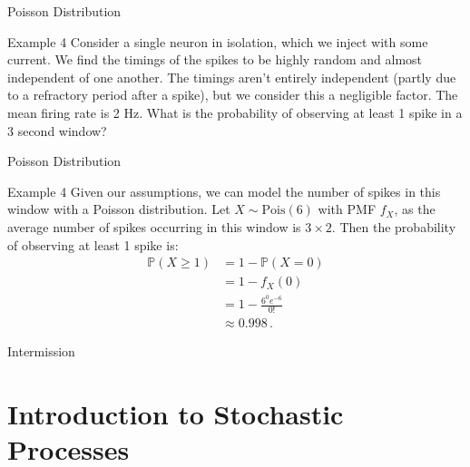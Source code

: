 \documentclass[10pt]{beamer}
\begin{document}
\begin{frame}[fragile]{Poisson Distribution}
\begin{exampleblock}{Example 4}
Consider a single neuron in isolation, which we inject with some current. We find the timings of the spikes to be highly random and almost independent of one another. The timings aren't entirely independent (partly due to a refractory period after a spike), but we consider this a negligible factor. The mean firing rate is 2 Hz. What is the probability of observing at least 1 spike in a 3 second window?
\end{exampleblock}
\end{frame}

\begin{frame}[fragile]{Poisson Distribution}
\begin{exampleblock}{Example 4}
Given our assumptions, we can model the number of spikes in this window with a Poisson distribution. Let \(X \sim \textrm{Pois}\left(6\right)\) with PMF \(f_X\), as the average number of spikes occurring in this window is \(3\times2\). Then the probability of observing at least 1 spike is:
\begin{equation*}
\begin{aligned}
    \mathbb{P}\left(X \geq 1\right) &= 1 - \mathbb{P}\left(X = 0\right)\\
    &= 1 - f_X\left(0\right)\\
    &= 1 - \frac{6^0e^{-6}}{0!}\\
    &\approx 0.998\,.
\end{aligned}
\end{equation*}
\end{exampleblock}
\end{frame}

\begin{frame}[standout]
Intermission
\end{frame}

\section{Introduction to Stochastic Processes}
\end{document}
